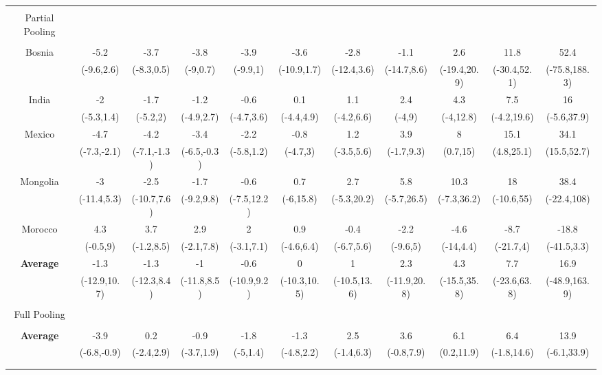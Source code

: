 \documentclass[english,12pt]{article}\usepackage{lmodern}
\numberwithin{equation}{section}
\begin{document}
\begin{landscape}
\begin{table}[!htbp]
\begin{tabular}{@{\extracolsep{5pt}} ccccccccccc}
\hline \\[-1.8ex]
Partial Pooling &&&&&&&&&& \\
\hline \\[-1.8ex]
Bosnia & -5.2 & -3.7 & -3.8 & -3.9 & -3.6 & -2.8 & -1.1 & 2.6 & 11.8 & 52.4 \\ 
& (-9.6,2.6) & (-8.3,0.5) & (-9,0.7) & (-9.9,1) & (-10.9,1.7) & (-12.4,3.6) & (-14.7,8.6) & (-19.4,20.9) & (-30.4,52.1) & (-75.8,188.3) \\ 
India & -2 & -1.7 & -1.2 & -0.6 & 0.1 & 1.1 & 2.4 & 4.3 & 7.5 & 16 \\ 
& (-5.3,1.4) & (-5.2,2) & (-4.9,2.7) & (-4.7,3.6) & (-4.4,4.9) & (-4.2,6.6) & (-4,9) & (-4,12.8) & (-4.2,19.6) & (-5.6,37.9) \\ 
 Mexico &  -4.7 & -4.2 & -3.4 & -2.2 & -0.8 & 1.2 & 3.9 & 8 & 15.1 & 34.1 \\ 
 &  (-7.3,-2.1) & (-7.1,-1.3) & (-6.5,-0.3) & (-5.8,1.2) & (-4.7,3) & (-3.5,5.6) & (-1.7,9.3) & (0.7,15) & (4.8,25.1) & (15.5,52.7) \\ 
Mongolia &  -3 & -2.5 & -1.7 & -0.6 & 0.7 & 2.7 & 5.8 & 10.3 & 18 & 38.4 \\ 
 &(-11.4,5.3) & (-10.7,7.6) & (-9.2,9.8) & (-7.5,12.2) & (-6,15.8) & (-5.3,20.2) & (-5.7,26.5) & (-7.3,36.2) & (-10.6,55) & (-22.4,108) \\ 
 Morocco &  4.3 & 3.7 & 2.9 & 2 & 0.9 & -0.4 & -2.2 & -4.6 & -8.7 & -18.8 \\ 
& (-0.5,9) & (-1.2,8.5) & (-2.1,7.8) & (-3.1,7.1) & (-4.6,6.4) & (-6.7,5.6) & (-9.6,5) & (-14,4.4) & (-21.7,4) & (-41.5,3.3) \\ 
\hline
\textbf{Average} & -1.3 & -1.3 & -1 & -0.6 & 0 & 1 & 2.3 & 4.3 & 7.7 & 16.9 \\ 
 & (-12.9,10.7) & (-12.3,8.4) & (-11.8,8.5) & (-10.9,9.2) & (-10.3,10.5) & (-10.5,13.6) & (-11.9,20.8) & (-15.5,35.8) & (-23.6,63.8) & (-48.9,163.9) \\ 
 \hline \\[-1.8ex]
Full Pooling &&&&&&&&&& \\
\hline \\[-1.8ex]
\textbf{Average}  & -3.9 & 0.2 & -0.9 & -1.8 & -1.3 & 2.5 & 3.6 & 6.1 & 6.4 & 13.9 \\
 &  (-6.8,-0.9) & (-2.4,2.9) & (-3.7,1.9) & (-5,1.4) & (-4.8,2.2) & (-1.4,6.3) & (-0.8,7.9) & (0.2,11.9) & (-1.8,14.6) & (-6.1,33.9) \\ 

\hline \\[-1.8ex]

\hline \\[-1.8ex]


\end{tabular}
\end{table}
\end{landscape}
\end{document}

